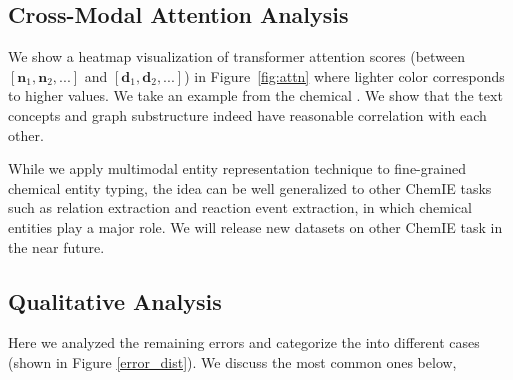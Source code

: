 
	


\subsection{Cross-Modal Attention Analysis}
We show a heatmap visualization of transformer attention scores (between $[\mathbf{n}_1, \mathbf{n}_2,...]$ and $[\mathbf{d}_1, \mathbf{d}_2,...]$) in Figure~\ref{fig:attn} where lighter color corresponds to higher values. We take an example from the chemical . We show that the text concepts and graph substructure indeed have reasonable correlation with each other.


While we apply multimodal entity representation technique to fine-grained chemical entity typing, the idea can be well generalized to other ChemIE tasks such as relation extraction and reaction event extraction, in which chemical entities play a major role. We will release new datasets on other ChemIE task in the near future.



\subsection{Qualitative Analysis}
Here we analyzed the remaining errors and categorize the into different cases  (shown in Figure \ref{error_dist}). We discuss the most common ones below,



